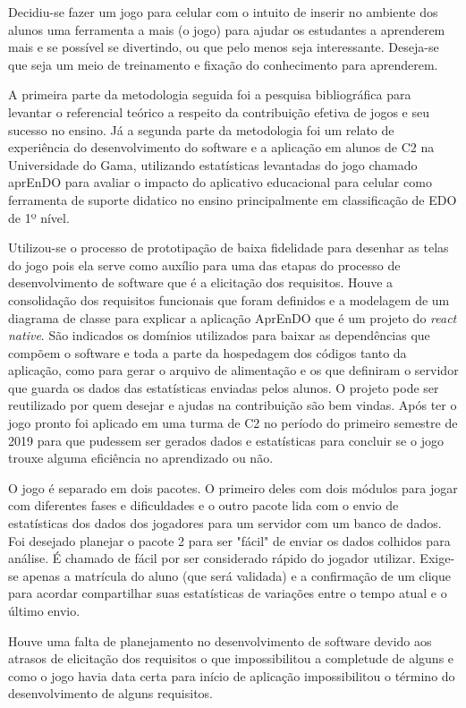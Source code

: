 Decidiu-se fazer um jogo para celular com o intuito de inserir no ambiente dos alunos uma ferramenta a mais (o jogo) para ajudar os estudantes a aprenderem mais e se possível se divertindo, ou que pelo menos seja interessante. Deseja-se que seja um meio de treinamento e fixação do conhecimento para aprenderem.

A primeira parte da metodologia seguida foi a pesquisa bibliográfica para levantar o referencial teórico a respeito da contribuição efetiva de jogos e seu sucesso no ensino. Já a segunda parte da metodologia foi um relato de experiência do desenvolvimento do software e a aplicação em alunos de C2 na Universidade do Gama, utilizando estatísticas levantadas do jogo chamado aprEnDO para avaliar o impacto do aplicativo educacional para celular como ferramenta de suporte didatico no ensino principalmente em classificação de EDO de 1º nível.

Utilizou-se o processo de prototipação de baixa fidelidade para desenhar as telas do jogo pois ela serve como auxílio para uma das etapas do processo de desenvolvimento de software que é a elicitação dos requisitos. Houve a consolidação dos requisitos funcionais que foram definidos e a modelagem de um diagrama de classe para explicar a aplicação AprEnDO que é um projeto do \textit{react native}. São indicados os domínios utilizados para baixar as dependências que compõem o software e toda a parte da hospedagem dos códigos tanto da aplicação, como para gerar o arquivo de alimentação e os que definiram o servidor que guarda os dados das estatísticas enviadas pelos alunos. O projeto pode ser reutilizado por quem desejar e ajudas na contribuição são bem vindas. Após ter o jogo pronto foi aplicado em uma turma de C2 no período do primeiro semestre de 2019 para que pudessem ser gerados dados e estatísticas para concluir se o jogo trouxe alguma eficiência no aprendizado ou não.

O jogo é separado em dois pacotes. O primeiro deles com dois módulos para jogar com diferentes fases e dificuldades e o outro pacote lida com o envio de estatísticas dos dados dos jogadores para um servidor com um banco de dados. Foi desejado planejar o pacote 2 para ser "fácil" de enviar os dados colhidos para análise. É chamado de fácil por ser considerado rápido do jogador utilizar. Exige-se apenas a matrícula do aluno (que será validada) e a confirmação de um clique para acordar compartilhar suas estatísticas de variações entre o tempo atual e o último envio.

Houve uma falta de planejamento no desenvolvimento de software devido aos atrasos de elicitação dos requisitos o que impossibilitou a completude de alguns e como o jogo havia data certa para início de aplicação impossibilitou o término do desenvolvimento de alguns requisitos. 

